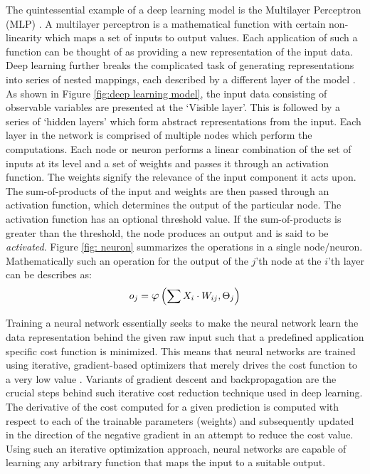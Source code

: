 The quintessential example of a deep learning model is the Multilayer Perceptron (MLP) \cite{Goodfellow-et-al-2016}. A multilayer perceptron is a mathematical function with certain non-linearity which maps a set of inputs to output values. Each application of such a function can be thought of as providing a new representation of the input data. Deep learning further breaks the complicated task of generating representations into series of nested mappings, each described by a different layer of the model \cite{Goodfellow-et-al-2016}. As shown in Figure \ref{fig:deep learning model}, the input data consisting of observable variables are presented at the `Visible layer'. This is followed by a series of `hidden layers' which form abstract representations from the input. Each layer in the network is comprised of multiple nodes which perform the computations. Each node or neuron performs a linear combination of the set of inputs at its level and a set of weights and passes it through an activation function. The weights signify the relevance of the input component it acts upon. The sum-of-products of the input and weights are then passed through an activation function, which determines the output of the particular node. The activation function has an optional threshold value. If the sum-of-products is greater than the threshold, the node produces an output and is said to be \textit{activated}. Figure \ref{fig: neuron} summarizes the operations in a single node/neuron.
Mathematically such an operation for the output of the $j$'th node at the $i$'th layer can be describes as:
\begin{align*}
	 o_j = \mathlarger \varphi \left( \sum X_i \cdot W_{ij} , \Theta_j \right) 
\end{align*}


Training a neural network essentially seeks to make the neural network learn the data representation behind the given raw input such that a predefined application specific cost function is minimized. This means that neural networks are trained using iterative, gradient-based optimizers that merely drives the cost function to a very low value \cite{Goodfellow-et-al-2016}. Variants of gradient descent and backpropagation are the crucial steps behind such iterative cost reduction technique used in deep learning. The derivative of the cost computed for a given prediction is computed with respect to each of the trainable parameters (weights) and subsequently updated in the direction of the negative gradient in an attempt to reduce the cost value. Using such an iterative optimization approach, neural networks are capable of learning any arbitrary function that maps the input to a suitable output.

